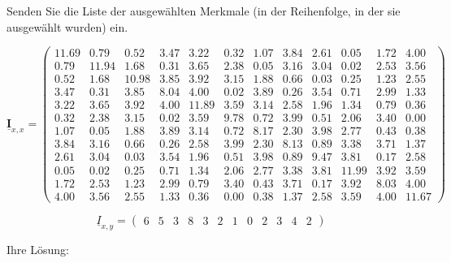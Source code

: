 \documentclass[11pt]{article}
\begin{document}
Senden Sie die Liste der ausgewählten Merkmale (in der Reihenfolge, in
der sie ausgewählt wurden) ein.

\[\underline{\textbf{I}}_{x, x} = \left(\begin{array}{rrrrrrrrrrrr}%
11.69 & 0.79 & 0.52 & 3.47 & 3.22 & 0.32 & 1.07 & 3.84 & 2.61 & 0.05 & 1.72 & 4.00 \\
0.79 & 11.94 & 1.68 & 0.31 & 3.65 & 2.38 & 0.05 & 3.16 & 3.04 & 0.02 & 2.53 & 3.56 \\
0.52 & 1.68 & 10.98 & 3.85 & 3.92 & 3.15 & 1.88 & 0.66 & 0.03 & 0.25 & 1.23 & 2.55 \\
3.47 & 0.31 & 3.85 & 8.04 & 4.00 & 0.02 & 3.89 & 0.26 & 3.54 & 0.71 & 2.99 & 1.33 \\
3.22 & 3.65 & 3.92 & 4.00 & 11.89 & 3.59 & 3.14 & 2.58 & 1.96 & 1.34 & 0.79 & 0.36 \\
0.32 & 2.38 & 3.15 & 0.02 & 3.59 & 9.78 & 0.72 & 3.99 & 0.51 & 2.06 & 3.40 & 0.00 \\
1.07 & 0.05 & 1.88 & 3.89 & 3.14 & 0.72 & 8.17 & 2.30 & 3.98 & 2.77 & 0.43 & 0.38 \\
3.84 & 3.16 & 0.66 & 0.26 & 2.58 & 3.99 & 2.30 & 8.13 & 0.89 & 3.38 & 3.71 & 1.37 \\
2.61 & 3.04 & 0.03 & 3.54 & 1.96 & 0.51 & 3.98 & 0.89 & 9.47 & 3.81 & 0.17 & 2.58 \\
0.05 & 0.02 & 0.25 & 0.71 & 1.34 & 2.06 & 2.77 & 3.38 & 3.81 & 11.99 & 3.92 & 3.59 \\
1.72 & 2.53 & 1.23 & 2.99 & 0.79 & 3.40 & 0.43 & 3.71 & 0.17 & 3.92 & 8.03 & 4.00 \\
4.00 & 3.56 & 2.55 & 1.33 & 0.36 & 0.00 & 0.38 & 1.37 & 2.58 & 3.59 & 4.00 & 11.67
\end{array}\right)
\]

\[\underline{I}_{x, y} = \left(\begin{array}{cccccccccccc}%
6 & 5 & 3 & 8 & 3 & 2 & 1 & 0 & 2 & 3 & 4 & 2
\end{array}\right)
\]

Ihre Lösung:
\end{document}
